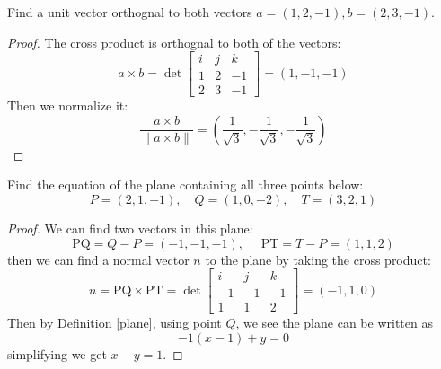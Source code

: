 \documentclass[openany]{book}
\begin{document}
\begin{prob}
    Find a unit vector orthognal to both vectors $a=(1,2,-1), b=(2,3,-1)$.
\end{prob}
\begin{proof}
    The cross product is orthognal to both of the vectors:
    \begin{equation*}
        a\times b=\det\begin{bmatrix}
            i&j&k\\
            1&2&-1\\
            2&3&-1
        \end{bmatrix}=(1,-1, -1)
    \end{equation*}
    Then we normalize it:
    \begin{equation*}
        \frac{a\times b}{\|a\times b\|}=\left(\frac{1}{\sqrt{3}}, -\frac{1}{\sqrt{3}}, -\frac{1}{\sqrt{3}}\right)
    \end{equation*}
\end{proof}


\begin{prob}
    Find the equation of the plane containing all three points below:
    \begin{equation*}
        P=(2,1,-1), \quad Q=(1,0,-2), \quad T=(3,2,1)
    \end{equation*}
\end{prob}
\begin{proof}
    We can find two vectors in this plane:
    \begin{equation*}
        \text{PQ}=Q-P=(-1,-1,-1), \quad \text{ PT}=T-P=(1,1,2)
    \end{equation*}
    then we can find a normal vector $n$ to the plane by taking the cross product:
    \begin{equation*}
        n=\text{PQ}\times\text{PT}=\det\begin{bmatrix}
            i&j&k\\
            -1&-1&-1\\
            1&1&2
        \end{bmatrix}=(-1,1,0)
    \end{equation*}
    Then by Definition \ref{plane}, using point $Q$, we see the plane can be written as 
    \begin{equation*}
        -1(x-1)+y=0
    \end{equation*}
    simplifying we get $x-y=1$.
\end{proof}
\end{document}
